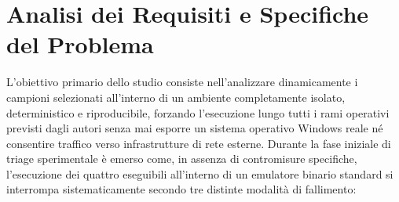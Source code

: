 \documentclass[11pt, a4paper]{article}
\begin{document}
\section{Analisi dei Requisiti e Specifiche del Problema}

L'obiettivo primario dello studio consiste nell'analizzare dinamicamente i campioni selezionati all'interno di un ambiente completamente isolato, deterministico e riproducibile, forzando l'esecuzione lungo tutti i rami operativi previsti dagli autori senza mai esporre un sistema operativo Windows reale n\'e consentire traffico verso infrastrutture di rete esterne. Durante la fase iniziale di triage sperimentale \`e emerso come, in assenza di contromisure specifiche, l'esecuzione dei quattro eseguibili all'interno di un emulatore binario standard si interrompa sistematicamente secondo tre distinte modalit\`a di fallimento:
\end{document}
